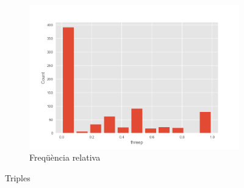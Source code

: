 \documentclass{article}
\begin{document}
\begin{figure}[!h]
\begin{subfigure}[b]{0.25\textwidth}
		\includegraphics[width=\textwidth]{hist12}
		\caption*{Freqüència relativa}
		\label{fig:hist12}
	\end{subfigure}
	\caption{Triples}
	\label{fig:triples}
\end{figure}
\end{document}

